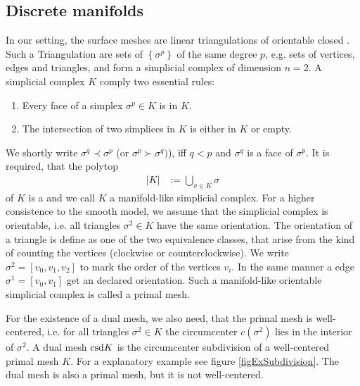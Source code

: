   \subsection{Discrete manifolds}
    In our setting, the surface meshes are linear triangulations of orientable closed .
    Such a Triangulation are sets of  \( \left\{ \sigma^{p} \right\} \) of the same degree \( p \), e.g. sets of vertices,
    edges and triangles, and form a simplicial complex of dimension \( n=2 \).
    A simplicial complex \( K \) comply two essential rules:
    \begin{enumerate}
      \item Every face of a simplex \( \sigma^{p}\in K \) is in \( K \).
      \item The intersection of two simplices in \( K \) is either in \( K \) or empty.
    \end{enumerate}
    We shortly write \( \sigma^{q}\prec\sigma^{p} \) (or \( \sigma^{p}\succ\sigma^{q}) \)), 
    iff \( q<p \) and \( \sigma^{q} \) is a face of \( \sigma^{p} \). 
    It is required, that the polytop
    \begin{align}
      |K| &:= \bigcup_{\sigma\in K} \sigma 
    \end{align}
    of \( K \) is a  and we call \( K \) a manifold-like simplicial complex.
    For a higher consistence to the smooth model, we assume that the simplicial complex is orientable,
    i.e. all triangles \( \sigma^{2}\in K \) have the same orientation.
    The orientation of a triangle is define as one of the two equivalence classes, that arise from the kind of counting the vertices
    (clockwise or counterclockwise).
    We write \( \sigma^{2}=\left[ v_{0}, v_{1}, v_{2} \right] \) to mark the order of the vertices \( v_{i} \).
    In the same manner a edge \( \sigma^{1} = \left[ v_{0}, v_{1} \right] \) get an declared orientation.
    Such a manifold-like orientable simplicial complex is called a primal mesh.

    For the existence of a dual mesh, we also need, that the primal mesh is well-centered, 
    i.e. for all triangles \( \sigma^{2}\in K \) the circumcenter \( c(\sigma^{2}) \) lies in the interior of \( \sigma^{2} \).
    A dual mesh \( \text{csd} K \) is the circumcenter subdivision of a well-centered primal mesh \( K \).
    For a explanatory example see figure \ref{figExSubdivision}.
    The dual mesh is also a primal mesh, but it is not well-centered.

